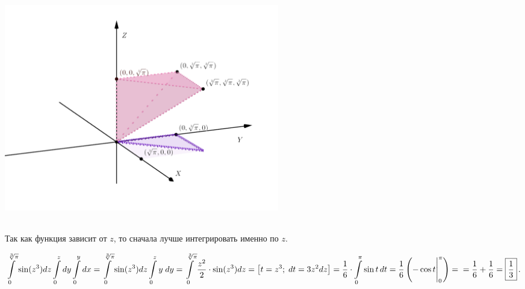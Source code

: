 \documentclass[a4paper, fleqn]{article}
\begin{document}
    \includegraphics[width=12cm, height=10cm]{list24imgs/task 2.4.11.png}        
    
    Так как функция зависит от $z$, то сначала лучше интегрировать именно по $z$. 
    
    $\displaystyle \int \limits_{0}^{\sqrt[3]{\pi}} \sin (z^3) dz \int \limits_{0}^{z} dy
    \int \limits_{0}^{y} dx = 
     \int \limits_{0}^{\sqrt[3]{\pi}} \sin (z^3) dz \int \limits_{0}^{z} y \; dy = 
     \int \limits_{0}^{\sqrt[3]{\pi}}  \frac{z^2}{2} \cdot \sin (z^3) dz = \left[ t = z^3; \; dt = 3z^2dz \right] =  
     \frac{1}{6} \cdot \int \limits_{0}^{\pi}    \sin t \, dt = \frac{1}{6} \left( -\cos t \Bigg|_{0}^{\pi}\right) = \\ = \frac{1}{6} + \frac{1}{6} = \boxed{\frac{1}{3}} \, .$
    
    
    
    
    
\end{document}
